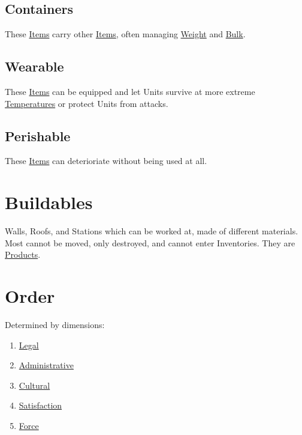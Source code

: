 \documentclass[11pt]{article}
\begin{document}
\subsection{Containers \label{orge5316d5} \label{org0f27c43}}
\label{sec:org4a7ad82}
These \hyperref[org4612467]{Items} carry other \hyperref[org4612467]{Items}, often managing \hyperref[orgf5aa833]{Weight} and \hyperref[org7af52ad]{Bulk}.\\
\subsection{Wearable \label{org42fe002} \label{org87f51de}}
\label{sec:orgd24cf05}
These \hyperref[org4612467]{Items} can be equipped and let Units survive at more extreme \hyperref[org3ec9870]{Temperatures} or protect Units from attacks.\\
\subsection{Perishable \label{orgf8818b6} \label{orge99079b}}
\label{sec:orgbda5b4f}
These \hyperref[org4612467]{Items} can deterioriate without being used at all.\\
\section{Buildables \label{orgccb7451} \label{orgb7b8c78}}
\label{sec:org48f3d22}
Walls, Roofs, and Stations which can be worked at, made of different materials. Most cannot be moved, only destroyed, and cannot enter Inventories. They are \hyperref[orgc5e54a9]{Products}.\\
\section{Order \label{orgd146db7} \label{orgb77977d}}
\label{sec:org3d6864d}
Determined by dimensions:\\
\begin{enumerate}
\item \hyperref[org39099d7]{Legal}\\
\item \hyperref[org6e4ede0]{Administrative}\\
\item \hyperref[org992a868]{Cultural}\\
\item \hyperref[orgda5f73b]{Satisfaction}\\
\item \hyperref[org3090cf7]{Force}\\
\end{enumerate}
\end{document}
